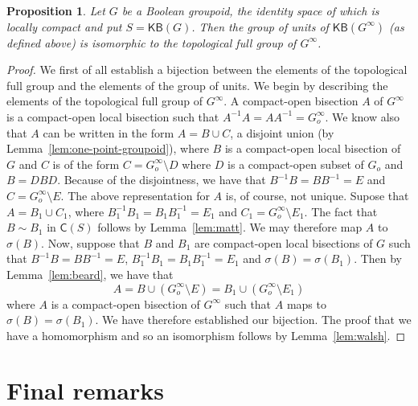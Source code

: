 \documentclass[a4paper]{amsart}
\newtheorem{proposition}[theorem]{Proposition}
\begin{document}
\begin{proposition}\label{prop:group-of-units} 
Let $G$ be a Boolean groupoid, the identity space of which is locally compact and put $S = \mathsf{KB}(G)$.
Then the group of units of $\mathsf{KB}(G^{\infty})$ (as defined above) is isomorphic to the topological full group of $G^{\infty}$.
\end{proposition}
\begin{proof}  
We first of all establish a bijection between the elements of the topological full group and the elements of the group of units.
We begin by describing the elements of the topological full group of $G^{\infty}$.
A compact-open bisection $A$ of $G^{\infty}$ is a compact-open local bisection such that
$A^{-1}A = AA^{-1} = G_{o}^{\infty}$.
We know also that $A$ can be written in the form $A = B \cup C$, a disjoint union (by Lemma~\ref{lem:one-point-groupoid}),
where $B$ is a compact-open local bisection of $G$ and $C$ is of the form
$C = G_{o}^{\infty}\setminus D$ where $D$ is a compact-open subset of $G_{o}$ and $B = DBD$.
Because of the disjointness, we have that $B^{-1}B = BB^{-1} = E$ and $C = G_{o}^{\infty}\setminus E$.
The above representation for $A$ is, of course, not unique.
Supose that $A = B_{1} \cup C_{1}$, where 
$B_{1}^{-1}B_{1} = B_{1}B_{1}^{-1} = E_{1}$ 
and 
$C_{1} = G_{o}^{\infty}\setminus E_{1}$.
The fact that $B \sim B_{1}$ in $\mathsf{C}(S)$ follows by Lemma~\ref{lem:matt}.
We may therefore map $A$ to $\sigma (B)$.
Now, suppose that $B$ and $B_{1}$ are compact-open local bisections of $G$
such that $B^{-1}B = BB^{-1} = E$, $B_{1}^{-1}B_{1} = B_{1}B_{1}^{-1} = E_{1}$ and $\sigma (B) = \sigma (B_{1})$.
Then by Lemma~\ref{lem:beard}, we have that 
$$A = B \cup (G_{o}^{\infty} \setminus E) 
= 
B_{1} \cup (G_{o}^{\infty} \setminus E_{1})$$
where $A$ is a compact-open bisection of $G^{\infty}$
such that $A$ maps to $\sigma (B) = \sigma (B_{1})$.
We have therefore established our bijection.
The proof that we have a homomorphism and so an isomorphism follows by Lemma~\ref{lem:walsh}.
\end{proof}









\section{Final remarks}
\end{document}
